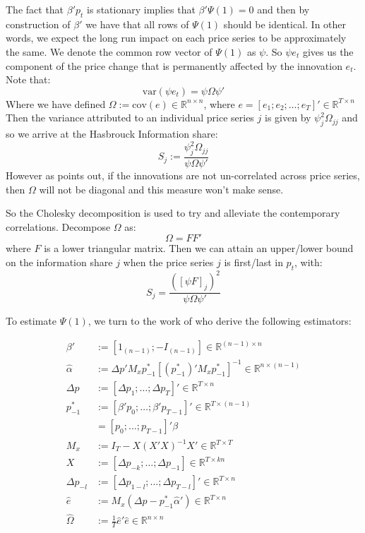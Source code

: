 \documentclass[a4paper, oneside, notitlepage]{book}
\begin{document}
The fact that $\beta' p_{t}$ is stationary implies that $\beta' \Psi(1) = 0$ and then by construction of $\beta'$ we have that all rows of $\Psi(1)$ should be identical. In other words, we expect the long run impact
on each price series to be approximately the same. We denote the common row vector
of $\Psi(1)$ as $\psi$. So $\psi e_{t}$ gives us the component of the price change that is permanently affected by the innovation $e_{t}$. Note that:
\begin{equation}
    \text{var}(\psi e_{t}) = \psi \Omega \psi'
\end{equation}
Where we have defined $\Omega := \text{cov}(e) \in \mathbb{R}^{n \times n}$, where $e = [e_{1}; e_{2}; \dots; e_{T}]' \in \mathbb{R}^{T \times n}$
Then the variance attributed to an individual price series $j$ is given by $\psi_{j}^{2} \Omega_{jj}$ and so we arrive at the Hasbrouck Information share:
\begin{equation}
    S_{j} := \frac{\psi_{j}^{2} \Omega_{jj}}{\psi \Omega \psi'} \label{Hasequation}
\end{equation}
However as \cite{HASBROUCK1995} points out, if the innovations are not un-correlated across price series, then $\Omega$ will not be diagonal and this measure won't make sense.

So the Cholesky decomposition is used to try and alleviate the contemporary correlations.
Decompose $\Omega$ as:
\begin{equation}
    \Omega = F F'
\end{equation}
where $F$ is a lower triangular matrix. Then we can attain an upper/lower bound on the
information share $j$ when the price series $j$ is first/last in $p_{t}$, with:
\begin{equation}
    S_{j} = \frac{([\psi F]_{j})^{2}}{\psi \Omega \psi'}
\end{equation}

To estimate $\Psi(1)$, we turn to the work of \cite{KARABIYIK2022} who derive the following estimators:

\begin{align}
\beta' &:= [1_{(n-1)}; -I_{(n-1)}] \in \mathbb{R}^{(n-1) \times n} \\
\hat{\alpha} &:= \Delta p' M_{x} p_{-1}^* [ (p_{-1}^*)' M_{x} p_{-1}^*]^{-1} \in \mathbb{R}^{n \times (n-1)}\\
\Delta p &:= [\Delta p_{1}; \dots ; \Delta p_{T}]' \in \mathbb{R}^{T \times n} \\ 
p_{-1}^* &:= [\beta' p_{0}; \dots ; \beta' p_{T-1}]' \in \mathbb{R}^{T \times (n-1)} \\
&= [p_{0}; \dots ; p_{T-1}]' \beta \\
M_{x} &:= I_{T} - X(X'X)^{-1} X' \in \mathbb{R}^{T \times T} \\
X &:= [\Delta p_{-k}; \dots ; \Delta p_{-1}] \in \mathbb{R}^{T \times kn} \\
\Delta p_{-l} &:= [\Delta p_{1-l}; \dots ; \Delta p_{T-l}]' \in \mathbb{R}^{T \times n} \\
\hat{e} &:= M_{x}(\Delta p - p^{*}_{-1} \hat{\alpha}') \in \mathbb{R}^{T \times n}\\
\hat{\Omega} &:= \frac{1}{T} \hat{e}' \hat{e} \in \mathbb{R}^{n \times n}
\end{align}
\end{document}
